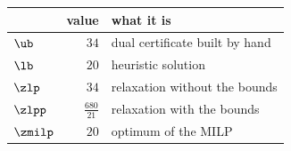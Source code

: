 \begin{center}\small
\begin{tabular}{lrl}
\toprule
 & value & what it is \\
\midrule
$\ub$ & $34$ & dual certificate built by hand \\
$\lb$ & $20$ & heuristic solution \\
$\zlp$ & $34$ & relaxation without the bounds \\
$\zlpp$ & $\frac{680}{21}$ & relaxation with the bounds \\
$\zmilp$ & $20$ & optimum of the MILP \\
\bottomrule
\end{tabular}
\end{center}
